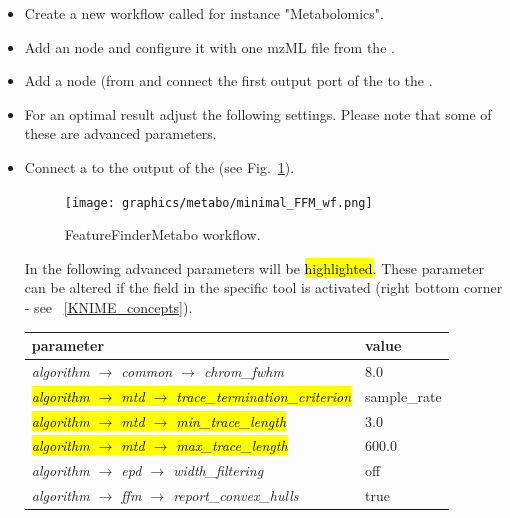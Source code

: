 \begin{itemize}
\item
Create a new workflow called for instance "Metabolomics".
\item
Add an  node and configure it with one mzML file from the .
\item
Add a  node (from  and connect the first output port of the  to the .
\item
For an optimal result adjust the following settings.
Please note that some of these are advanced parameters.
\item
Connect a  to the output of the  (see Fig.~\ref{fig:minimal_FFM_wf}).
\begin{figure}[!htbp]
  \centering
  \texttt{[image: graphics/metabo/minimal\_FFM\_wf.png]}
  \caption{FeatureFinderMetabo workflow.}
  \label{fig:minimal_FFM_wf}
\end{figure}

In the following advanced parameters will be \hl{highlighted}. These parameter can be altered if the  field in the specific tool is activated (right bottom corner - see ~\ref{KNIME_concepts}). 

\begin{center}
\begin{tabular}{l|l}
\textbf{parameter} & \textbf{value} \\ \hline
\textit{algorithm $\rightarrow$ common $\rightarrow$ chrom\_fwhm} & $8.0$ \\
\hl{\textit{algorithm $\rightarrow$ mtd $\rightarrow$ trace\_termination\_criterion}} & sample\_rate \\
\hl{\textit{algorithm $\rightarrow$ mtd $\rightarrow$ min\_trace\_length}} & $3.0$ \\
\hl{\textit{algorithm $\rightarrow$ mtd $\rightarrow$ max\_trace\_length}} & $600.0$\\
\textit{algorithm $\rightarrow$ epd $\rightarrow$ width\_filtering} & off \\
\textit{algorithm $\rightarrow$ ffm $\rightarrow$ report\_convex\_hulls} & true
\end{tabular}
\end{center}
\end{itemize}

